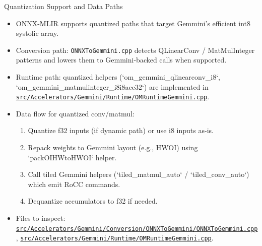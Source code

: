 \documentclass[aspectratio=169,10pt]{beamer}
\newcommand{\code}[1]{\texttt{\footnotesize #1}}
\newcommand{\repoRoot}{/home/lahcen/toolchains/onnx-mlir-xcompile/onnx-mlir}
\newcommand{\pathcode}[1]{\href{run:\repoRoot/#1}{\texttt{\scriptsize #1}}}
\begin{document}
\begin{frame}{Quantization Support and Data Paths}
  \scriptsize
  \begin{itemize}
    \item ONNX-MLIR supports quantized paths that target Gemmini's efficient int8 systolic array.
    \item Conversion path: \code{ONNXToGemmini.cpp} detects QLinearConv / MatMulInteger patterns and lowers them to Gemmini-backed calls when supported.
    \item Runtime path: quantized helpers (`om_gemmini_qlinearconv_i8`, `om_gemmini_matmulinteger_i8i8acc32`) are implemented in \pathcode{src/Accelerators/Gemmini/Runtime/OMRuntimeGemmini.cpp}.
    \item Data flow for quantized conv/matmul:
      \begin{enumerate}
        \item Quantize f32 inputs (if dynamic path) or use i8 inputs as-is.
        \item Repack weights to Gemmini layout (e.g., HWOI) using `packOIHWtoHWOI` helper.
        \item Call tiled Gemmini helpers (`tiled_matmul_auto` / `tiled_conv_auto`) which emit RoCC commands.
        \item Dequantize accumulators to f32 if needed.
      \end{enumerate}
    \item Files to inspect: \pathcode{src/Accelerators/Gemmini/Conversion/ONNXToGemmini/ONNXToGemmini.cpp}, \pathcode{src/Accelerators/Gemmini/Runtime/OMRuntimeGemmini.cpp}.
  \end{itemize}
\end{frame}
\end{document}
